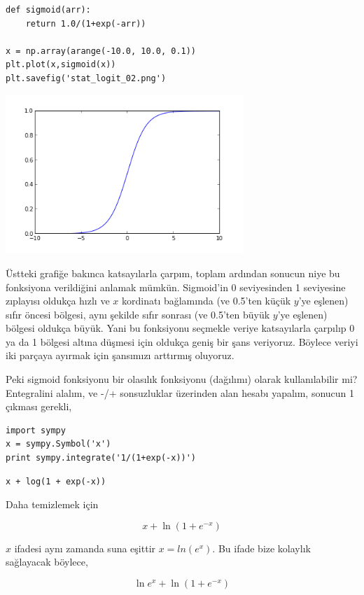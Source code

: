 \documentclass[12pt,fleqn]{article}\usepackage{../../common}
\begin{document}
\begin{verbatim}
def sigmoid(arr):
    return 1.0/(1+exp(-arr))

x = np.array(arange(-10.0, 10.0, 0.1))
plt.plot(x,sigmoid(x))
plt.savefig('stat_logit_02.png')
\end{verbatim}

\includegraphics[height=6cm]{stat_logit_02.png}

Üstteki grafiğe bakınca katsayılarla çarpım, toplam ardından sonucun niye bu
fonksiyona verildiğini anlamak mümkün. Sigmoid'in 0 seviyesinden 1 seviyesine
zıplayısı oldukça hızlı ve $x$ kordinatı bağlamında (ve 0.5'ten küçük $y$'ye
eşlenen) sıfır öncesi bölgesi, aynı şekilde sıfır sonrası (ve 0.5'ten büyük
$y$'ye eşlenen) bölgesi oldukça büyük. Yani bu fonksiyonu seçmekle veriye
katsayılarla çarpılıp 0 ya da 1 bölgesi altına düşmesi için oldukça geniş bir
şans veriyoruz.  Böylece veriyi iki parçaya ayırmak için şansımızı arttırmış
oluyoruz.

Peki sigmoid fonksiyonu bir olasılık fonksiyonu (dağılımı) olarak kullanılabilir
mi?  Entegralini alalım, ve -/+ sonsuzluklar üzerinden alan hesabı yapalım,
sonucun 1 çıkması gerekli,

\begin{verbatim}
import sympy
x = sympy.Symbol('x')
print sympy.integrate('1/(1+exp(-x))')
\end{verbatim}

\begin{verbatim}
x + log(1 + exp(-x))
\end{verbatim}

Daha temizlemek için

$$ x + \ln(1 + e^{-x}) $$

$x$ ifadesi aynı zamanda suna eşittir $x=ln( e^{x} )$. Bu ifade bize
kolaylık sağlayacak böylece,

$$ \ln e^{x} + \ln(1+e^{-x})  $$
\end{document}
